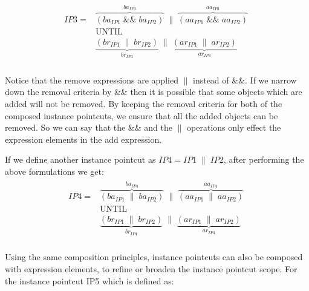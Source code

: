 \documentclass{acm_proc_article-sp}
\begin{document}
\begin{align}
\begin{split}
IP3 =& \overbrace{\left( ba_{IP1}\;\textrm{\&\&}\;ba_{IP2}\right)}^{ba_{IP3}}\;\|\;\overbrace{\left( aa_{IP1}\;\textrm{\&\&}\;aa_{IP2} \right)}^{aa_{IP3}}\;\\
&\textrm{UNTIL} \\
&\underbrace{\left( br_{IP1}\;\|\;br_{IP2}\right)}_{br_{IP3}}\;\|\;\underbrace{\left( ar_{IP1}\;\|\;ar_{IP2} \right)}_{ar_{IP3}}\;\\  
\label{ip3step}
\end{split}
\end{align}

Notice that the remove expressions are applied $\|$ instead of \&\&. If we narrow down the removal criteria by \&\& then it is possible that some objects which are added will not be removed. By keeping the removal criteria for both of the composed instance pointcuts, we ensure that all the added objects can be removed. So we can say that the \&\& and the $\|$ operations only effect the expression elements in the add expression.


If we define another instance pointcut as $ IP4 = IP1\;\|\;IP2$, after performing the above formulations we get:
\begin{align}
\begin{split}
IP4 =& \overbrace{\left( ba_{IP1}\;\|\;ba_{IP2}\right)}^{ba_{IP4}}\;\|\;\overbrace{\left( aa_{IP1}\;\|\;aa_{IP2} \right)}^{aa_{IP4}}\;\\
&\textrm{UNTIL} \\
&\underbrace{\left( br_{IP1}\;\|\;br_{IP2}\right)}_{br_{IP4}}\;\|\;\underbrace{\left( ar_{IP1}\;\|\;ar_{IP2} \right)}_{ar_{IP4}}\;\\  
\label{ip3step}
\end{split}
\end{align}


Using the same composition principles, instance pointcuts can also be composed with expression elements, to refine or broaden the instance pointcut scope. For the instance pointcut IP5 which is defined as:
\end{document}
